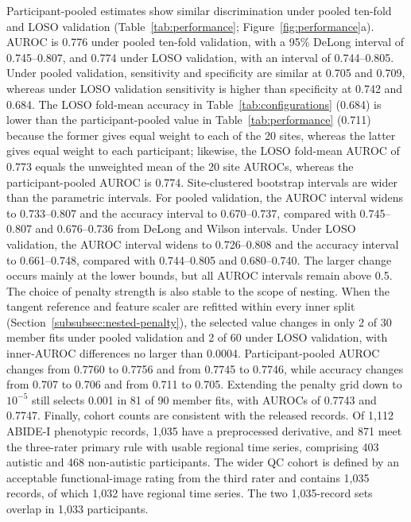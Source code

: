 Participant-pooled estimates show similar discrimination under pooled ten-fold and LOSO validation (Table~\ref{tab:performance}; Figure~\ref{fig:performance}a). AUROC is 0.776 under pooled ten-fold validation, with a 95\% DeLong interval of 0.745--0.807, and 0.774 under LOSO validation, with an interval of 0.744--0.805. Under pooled validation, sensitivity and specificity are similar at 0.705 and 0.709, whereas under LOSO validation sensitivity is higher than specificity at 0.742 and 0.684. The LOSO fold-mean accuracy in Table~\ref{tab:configurations} (0.684) is lower than the participant-pooled value in Table~\ref{tab:performance} (0.711) because the former gives equal weight to each of the 20 sites, whereas the latter gives equal weight to each participant; likewise, the LOSO fold-mean AUROC of 0.773 equals the unweighted mean of the 20 site AUROCs, whereas the participant-pooled AUROC is 0.774. Site-clustered bootstrap intervals are wider than the parametric intervals. For pooled validation, the AUROC interval widens to 0.733--0.807 and the accuracy interval to 0.670--0.737, compared with 0.745--0.807 and 0.676--0.736 from DeLong and Wilson intervals. Under LOSO validation, the AUROC interval widens to 0.726--0.808 and the accuracy interval to 0.661--0.748, compared with 0.744--0.805 and 0.680--0.740. The larger change occurs mainly at the lower bounds, but all AUROC intervals remain above 0.5. The choice of penalty strength is also stable to the scope of nesting. When the tangent reference and feature scaler are refitted within every inner split (Section~\ref{subsubsec:nested-penalty}), the selected value changes in only 2 of 30 member fits under pooled validation and 2 of 60 under LOSO validation, with inner-AUROC differences no larger than 0.0004. Participant-pooled AUROC changes from 0.7760 to 0.7756 and from 0.7745 to 0.7746, while accuracy changes from 0.707 to 0.706 and from 0.711 to 0.705. Extending the penalty grid down to $10^{-5}$ still selects 0.001 in 81 of 90 member fits, with AUROCs of 0.7743 and 0.7747. Finally, cohort counts are consistent with the released records. Of 1,112 ABIDE-I phenotypic records, 1,035 have a preprocessed derivative, and 871 meet the three-rater primary rule with usable regional time series, comprising 403 autistic and 468 non-autistic participants. The wider QC cohort is defined by an acceptable functional-image rating from the third rater and contains 1,035 records, of which 1,032 have regional time series. The two 1,035-record sets overlap in 1,033 participants.

